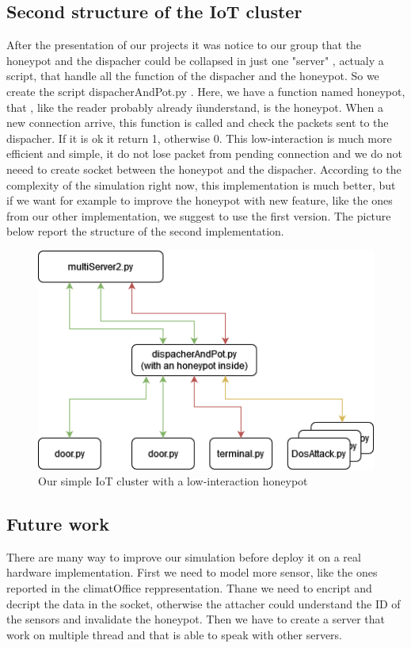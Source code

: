 \subsection{ Second structure of the IoT cluster}
After the presentation of our projects it was notice to our group that the honeypot and the dispacher could be collapsed in just one "server" , actualy a script, that handle all the function of the dispacher and the honeypot.  So we create the script dispacherAndPot.py . Here, we have a function named honeypot, that , like the reader probably already iìunderstand, is the honeypot. When a new connection arrive, this function is called and check the packets sent to the dispacher. If it is ok it return 1, otherwise 0. This low-interaction is much more efficient and simple, it do not lose packet from pending connection and we do not neeed to create socket between the honeypot and the dispacher. According to the complexity of the simulation right now, this implementation is much better, but if we want for example to improve the honeypot with new feature, like the ones from our other implementation, we suggest to use the first version. The picture below report the structure of the second implementation. 
\begin{figure}[h!]
  \centering
  \includegraphics[width = 12cm]{images/lowInterationHoneypot.drawio.png}
  \caption{Our simple IoT cluster with a low-interaction honeypot}
  \label{fig:DosImpl2}
\end{figure}
\FloatBarrier
\noindent

\subsection{ Future work}
There are many way to improve our simulation before deploy it on a real hardware implementation. First we need to model more sensor, like the ones reported in the climatOffice reppresentation. Thane we need to encript and decript the data in the socket, otherwise the attacher could understand the ID of the sensors and invalidate the honeypot. Then we have to create a server that work on multiple thread and that is able to speak with other servers. 









